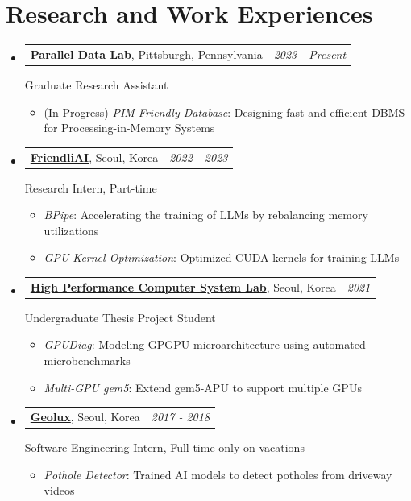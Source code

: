 \documentclass[a4paper]{article}
\makeatletter
\newcommand{\resumeSubheading}[4]{
  \vspace{-1pt}\item
    \begin{tabular*}{0.97\textwidth}{l@{\extracolsep{\fill}}r}
      \textbf{#1}, #2 & \textit{#3} \\
    \end{tabular*}
    #4
}
\newcommand{\resumeSubHeadingListStart}{\begin{itemize}[leftmargin=*]}
\newcommand{\resumeSubHeadingListEnd}{\end{itemize}}
\makeatother
\begin{document}
\section{Research and Work Experiences}
\resumeSubHeadingListStart
	\resumeSubheading
		{\href{https://pdl.cmu.edu/index.shtml}{Parallel Data Lab}}{Pittsburgh, Pennsylvania}{2023 - Present}
		{
			Graduate Research Assistant
			\vspace{-5pt}
			\begin{itemize}
				\item {(In Progress) \textit{PIM-Friendly Database}: Designing fast and efficient DBMS for Processing-in-Memory Systems}
			\end{itemize}
		}
	\resumeSubheading
		{\href{https://friendli.ai}{FriendliAI}}{Seoul, Korea}{2022 - 2023}
		{
			Research Intern, Part-time
			\vspace{-5pt}
			\begin{itemize}
				\item {\textit{BPipe}: Accelerating the training of LLMs by rebalancing memory utilizations}
				\item {\textit{GPU Kernel Optimization}: Optimized CUDA kernels for training LLMs}
			\end{itemize}
		}
	\resumeSubheading
		{\href{https://hpcs.snu.ac.kr/}{High Performance Computer System Lab}}{Seoul, Korea}{2021}
		{
			Undergraduate Thesis Project Student
			\begin{itemize}
				\item {\textit{GPUDiag}: Modeling GPGPU microarchitecture using automated microbenchmarks}
				\item {\textit{Multi-GPU gem5}: Extend gem5-APU to support multiple GPUs}
			\end{itemize}
		}
	\resumeSubheading
		{\href{http://www.geolux.co.kr/en/}{Geolux}}{Seoul, Korea}{2017 - 2018}
		{
			Software Engineering Intern, Full-time only on vacations
			\vspace{-5pt}
			\begin{itemize}
				\item {\textit{Pothole Detector}: Trained AI models to detect potholes from driveway videos}
			\end{itemize}
		}
\resumeSubHeadingListEnd
\end{document}

